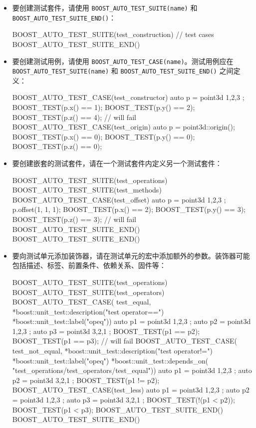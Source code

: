 \begin{itemize}
\item
要创建测试套件，请使用 \verb|BOOST_AUTO_TEST_SUITE(name)| 和 \verb|BOOST_AUTO_TEST_SUITE_END()|：

\begin{cpp}
BOOST_AUTO_TEST_SUITE(test_construction)
// test cases
BOOST_AUTO_TEST_SUITE_END()
\end{cpp}

\item
要创建测试用例，请使用 \verb|BOOST_AUTO_TEST_CASE(name)|。测试用例应在 \verb|BOOST_AUTO_TEST_SUITE(name)| 和 \verb|BOOST_AUTO_TEST_SUITE_END()| 之间定义：

\begin{cpp}
BOOST_AUTO_TEST_CASE(test_constructor)
{
    auto p = point3d{ 1,2,3 };
    BOOST_TEST(p.x() == 1);
    BOOST_TEST(p.y() == 2);
    BOOST_TEST(p.z() == 4); // will fail
}
BOOST_AUTO_TEST_CASE(test_origin)
{
    auto p = point3d::origin();
    BOOST_TEST(p.x() == 0);
    BOOST_TEST(p.y() == 0);
    BOOST_TEST(p.z() == 0);
}
\end{cpp}

\item
要创建嵌套的测试套件，请在一个测试套件内定义另一个测试套件：

\begin{cpp}
BOOST_AUTO_TEST_SUITE(test_operations)
BOOST_AUTO_TEST_SUITE(test_methods)
BOOST_AUTO_TEST_CASE(test_offset)
{
    auto p = point3d{ 1,2,3 };
    p.offset(1, 1, 1);
    BOOST_TEST(p.x() == 2);
    BOOST_TEST(p.y() == 3);
    BOOST_TEST(p.z() == 3); // will fail
}
BOOST_AUTO_TEST_SUITE_END()
BOOST_AUTO_TEST_SUITE_END()
\end{cpp}

\item
要向测试单元添加装饰器，请在测试单元的宏中添加额外的参数。装饰器可能包括描述、标签、前置条件、依赖关系、固件等：

\begin{cpp}
BOOST_AUTO_TEST_SUITE(test_operations)
BOOST_AUTO_TEST_SUITE(test_operators)
BOOST_AUTO_TEST_CASE(
test_equal,
*boost::unit_test::description("test operator==")
*boost::unit_test::label("opeq"))
{
    auto p1 = point3d{ 1,2,3 };
    auto p2 = point3d{ 1,2,3 };
    auto p3 = point3d{ 3,2,1 };
    BOOST_TEST(p1 == p2);
    BOOST_TEST(p1 == p3); // will fail
}
BOOST_AUTO_TEST_CASE(
test_not_equal,
*boost::unit_test::description("test operator!=")
*boost::unit_test::label("opeq")
*boost::unit_test::depends_on(
"test_operations/test_operators/test_equal"))
{
    auto p1 = point3d{ 1,2,3 };
    auto p2 = point3d{ 3,2,1 };
    BOOST_TEST(p1 != p2);
}
BOOST_AUTO_TEST_CASE(test_less)
{
    auto p1 = point3d{ 1,2,3 };
    auto p2 = point3d{ 1,2,3 };
    auto p3 = point3d{ 3,2,1 };
    BOOST_TEST(!(p1 < p2));
    BOOST_TEST(p1 < p3);
}
BOOST_AUTO_TEST_SUITE_END()
BOOST_AUTO_TEST_SUITE_END()
\end{cpp}
\end{itemize}

